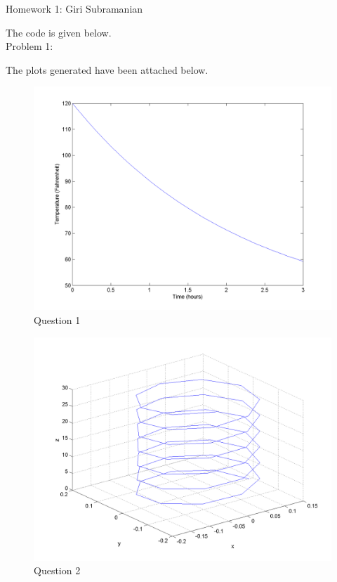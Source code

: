 \documentclass[11pt,a4paper]{report}
\begin{document}
\begin{center}
{\large Homework 1: Giri Subramanian}
\end{center}

The code is given below. \\
Problem 1:  


The plots generated have been attached below.

\begin{center}
\begin{figure}[!ht]
\includegraphics[scale=0.75]{Giri_Subramanian_HW_1_Problem_1}
\caption{Question 1}
\end{figure}

\begin{figure}[!ht]
\includegraphics[scale=0.75]{Giri_Subramanian_HW_1_Problem_2a}
\caption{Question 2}
\end{figure}
\end{center}
\end{document}
